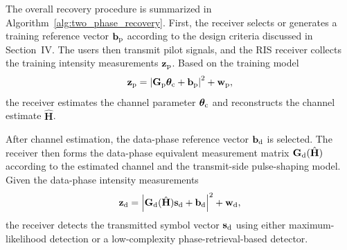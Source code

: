 \documentclass[journal]{IEEEtran}
\begin{document}
The overall recovery procedure is summarized in Algorithm~\ref{alg:two_phase_recovery}. 
First, the receiver selects or generates a training reference vector $\mathbf{b}_{\rm p}$ according to the design criteria discussed in Section~IV. 
The users then transmit pilot signals, and the RIS receiver collects the training intensity measurements $\mathbf{z}_{\rm p}$. 
Based on the training model
\begin{equation}
\mathbf{z}_{\rm p}
=
\left|
\mathbf{G}_{\rm p}\boldsymbol{\theta}_{\rm c}
+
\mathbf{b}_{\rm p}
\right|^2
+
\mathbf{w}_{\rm p},
\end{equation}
the receiver estimates the channel parameter $\boldsymbol{\theta}_{\rm c}$ and reconstructs the channel estimate $\hat{\mathbf{H}}$.

After channel estimation, the data-phase reference vector $\mathbf{b}_{\rm d}$ is selected. 
The receiver then forms the data-phase equivalent measurement matrix $\mathbf{G}_{\rm d}(\hat{\mathbf{H}})$ according to the estimated channel and the transmit-side pulse-shaping model. 
Given the data-phase intensity measurements
\begin{equation}
\mathbf{z}_{\rm d}
=
\left|
\mathbf{G}_{\rm d}(\hat{\mathbf{H}})\mathbf{s}_{\rm d}
+
\mathbf{b}_{\rm d}
\right|^2
+
\mathbf{w}_{\rm d},
\end{equation}
the receiver detects the transmitted symbol vector $\mathbf{s}_{\rm d}$ using either maximum-likelihood detection or a low-complexity phase-retrieval-based detector.
\end{document}
